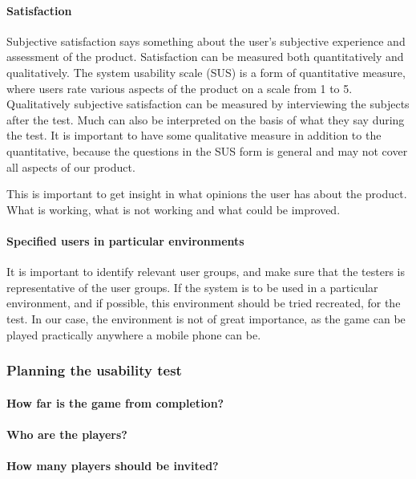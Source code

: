 \paragraph{Satisfaction}

Subjective satisfaction says something about the user's subjective experience and assessment of the product. Satisfaction can be measured both quantitatively and qualitatively. The system usability scale (SUS) is a form of quantitative measure, where users rate various aspects of the product on a scale from 1 to 5. Qualitatively subjective satisfaction can be measured by interviewing the subjects after the test. Much can also be interpreted on the basis of what they say during the test. It is important to have some qualitative measure in addition to the quantitative, because the questions in the SUS form is general and may not cover all aspects of our product.

This is important to get insight in what opinions the user has about the product. What is working, what is not working and what could be improved.

\paragraph{Specified users in particular environments}

It is important to identify relevant user groups, and make sure that the testers is representative of the user groups. If the system is to be used in a particular environment, and if possible, this environment should be tried recreated, for the test. In our case, the environment is not of great importance, as the game can be played practically anywhere a mobile phone can be.

\subsubsection{Planning the usability test}

\paragraph{How far is the game from completion?}

\paragraph{Who are the players?}

\paragraph{How many players should be invited?}

